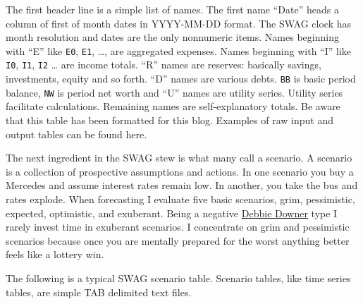 The first header line is a simple list of names. The first name ``Date''
heads a column of first of month dates in YYYY-MM-DD format. The SWAG
clock has month resolution and dates are the only nonnumeric items.
Names beginning with ``E'' like \texttt{E0}, \texttt{E1}, \ldots{}, are
aggregated expenses. Names beginning with ``I'' like \texttt{I0},
\texttt{I1}, \texttt{I2} \ldots{} are income totals. ``R'' names are
reserves: basically savings, investments, equity and so forth. ``D''
names are various debts. \texttt{BB} is basic period balance, 
\texttt{NW} is period net worth and ``U'' names are utility series.
Utility series facilitate calculations. Remaining names are
self-explanatory totals. Be aware that this table has been formatted for
this blog. Examples of raw input and output tables can be found here.

The next ingredient in the SWAG stew is what many call a scenario. A
scenario is a collection of prospective assumptions and actions. In one
scenario you buy a Mercedes and assume interest rates remain low. In
another, you take the bus and rates explode. When forecasting I evaluate
five basic scenarios, grim, pessimistic, expected, optimistic, and
exuberant. Being a negative
\href{http://www.urbandictionary.com/define.php?term=Debbie+Downer}{Debbie
Downer} type I rarely invest time in exuberant scenarios. I concentrate
on grim and pessimistic scenarios because once you are mentally prepared
for the worst anything better feels like a lottery win.

The following is a typical SWAG scenario table. Scenario tables, like
time series tables, are simple TAB delimited text files.

